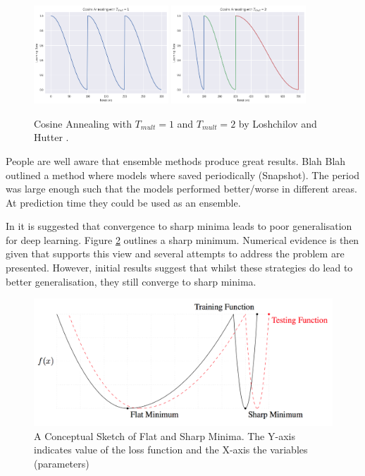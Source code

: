 \begin{figure}
    \centering
    \includegraphics[width=0.45\textwidth]{./img/tmul1.png}
    \includegraphics[width=0.45\textwidth]{./img/tmul2.png}
    \caption{Cosine Annealing with $T_{mult} = 1$ and $T_{mult} = 2$ by Loshchilov and Hutter \cite{Loshchilov_Hutter_2016}.}
    \label{fig:cosine_annealing}
\end{figure}

People are well aware that ensemble methods produce great results.
Blah Blah outlined a method where models where saved periodically (Snapshot).
The period was large enough such that the models performed better/worse in different areas.
At prediction time they could be used as an ensemble. \cite{Huang_Li_Pleiss_Liu_Hopcroft_Weinberger_2017}

In \cite{Keskar_Mudigere_Nocedal_Smelyanskiy_Tang_2016} it is suggested that convergence to sharp minima leads to poor generalisation for deep learning.
Figure \ref{fig:wide_optima} outlines a sharp minimum.
Numerical evidence is then given that supports this view and several attempts to address the problem are presented.
However, initial results suggest that whilst these strategies do lead to better generalisation, they still converge to sharp minima.

\begin{figure}
    \centering
    \includegraphics[width=\textwidth]{./img/Wide_optima.png}
    \caption{A Conceptual Sketch of Flat and Sharp Minima. The Y-axis indicates value of the loss function and the X-axis the variables (parameters) \cite{Keskar_Mudigere_Nocedal_Smelyanskiy_Tang_2016}}
    \label{fig:wide_optima}
\end{figure}


